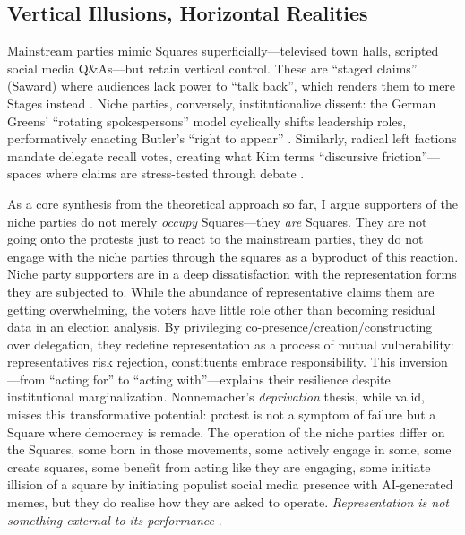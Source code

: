 \subsection{Vertical Illusions, Horizontal Realities}
Mainstream parties mimic Squares superficially—televised town halls, scripted social media Q\&As—but retain vertical control. These are \enquote{staged claims} (Saward) where audiences lack power to \enquote{talk back}, which renders them to mere Stages instead \parencite[8-9]{saward2024}. Niche parties, conversely, institutionalize dissent: the German Greens’ \enquote{rotating spokespersons} model cyclically shifts leadership roles, performatively enacting Butler’s \enquote{right to appear} \parencite[7]{kim2024}. Similarly, radical left factions mandate delegate recall votes, creating what Kim terms \enquote{discursive friction}—spaces where claims are stress-tested through debate \parencite[12]{kim2024}.

As a core synthesis from the theoretical approach so far, I argue supporters of the niche parties do not merely \textit{occupy} Squares—they \textit{are} Squares. They are not going onto the protests just to react to the mainstream parties, they do not engage with the niche parties through the squares as a byproduct of this reaction. Niche party supporters are in a deep dissatisfaction with the representation forms they are subjected to. While the abundance of representative claims them are getting overwhelming, the voters have little role other than becoming residual data in an election analysis. By privileging co-presence/creation/constructing over delegation, they redefine representation as a process of mutual vulnerability: representatives risk rejection, constituents embrace responsibility. This inversion—from \enquote{acting for} to \enquote{acting with}—explains their resilience despite institutional marginalization. Nonnemacher’s \textit{deprivation} thesis, while valid, misses this transformative potential: protest is not a symptom of failure but a Square where democracy is remade. The operation of the niche parties differ on the Squares, some born in those movements, some actively engage in some, some create squares, some benefit from acting like they are engaging, some initiate illision of a square by initiating populist social media presence with AI-generated memes, but they do realise how they are asked to operate. \textit{Representation is not something external to its performance} \parencite[302]{saward2010}.


%
%
%

